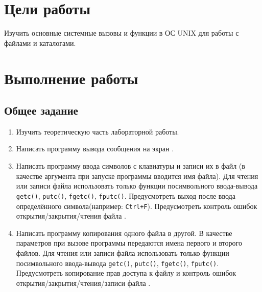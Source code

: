 \section{Цели работы}
\label{sec:target}

Изучить основные системные вызовы и функции в ОС UNIX для работы с файлами и каталогами.

\section{Выполнение работы}
\label{sec:job} 
\subsection{Общее задание}
\label{sec:job:general_task}

\begin{enumerate}[listparindent=\fivecharsapprox]
	\item Изучить теоретическую часть лабораторной работы.
	\item Написать программу вывода сообщения на экран .



	\item Написать программу ввода символов с клавиатуры и записи их в файл (в качестве аргумента при запуске программы вводится имя файла).
Для чтения или записи файла использовать только функции посимвольного ввода-вывода \lstinline{getc()}, \lstinline{putc()}, \lstinline{fgetc()}, \lstinline{fputc()}.
Предусмотреть выход после ввода определённого символа(например: \lstinline{Ctrl+F}).
Предусмотреть контроль ошибок открытия/закрытия/чтения файла .



	\item Написать программу копирования одного файла в другой.
В качестве параметров при вызове программы передаются имена первого и второго файлов.
Для чтения или записи файла использовать только функции посимвольного ввода-вывода \lstinline{getc()}, \lstinline{putc()}, \lstinline{fgetc()}, \lstinline{fputc()}.
Предусмотреть копирование прав доступа к файлу и контроль ошибок открытия/закрытия/чтения/записи файла .




\end{enumerate}
